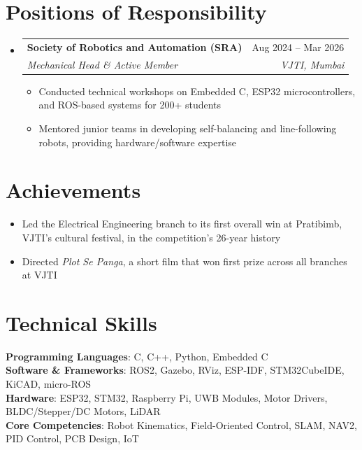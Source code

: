 \documentclass[a4paper,11pt]{article}
\makeatletter
\newcommand{\resumeItem}[1]{
  \item\small{
    {#1 \vspace{-2pt}}
  }
}
\newcommand{\resumeSubheading}[4]{
  \vspace{-2pt}\item
    \begin{tabular*}{0.97\textwidth}[t]{l@{\extracolsep{\fill}}r}
      \textbf{#1} & #2 \\
      \textit{\small#3} & \textit{\small #4} \\
    \end{tabular*}\vspace{-7pt}
}
\newcommand{\resumeItemListStart}{\begin{itemize}}
\newcommand{\resumeItemListEnd}{\end{itemize}\vspace{-7pt}}
\newcommand{\resumeSubHeadingListStart}{\begin{itemize}[leftmargin=0.15in, label={}]}
\newcommand{\resumeSubHeadingListEnd}{\end{itemize}}
\makeatother
\begin{document}
\section{Positions of Responsibility}
  \resumeSubHeadingListStart
    \resumeSubheading
      {Society of Robotics and Automation (SRA)}{Aug 2024 -- Mar 2026}
      {Mechanical Head \& Active Member}{VJTI, Mumbai}
      \resumeItemListStart
        \resumeItem{Conducted technical workshops on Embedded C, ESP32 microcontrollers, and ROS-based systems for 200+ students}
        \resumeItem{Mentored junior teams in developing self-balancing and line-following robots, providing hardware/software expertise}
      \resumeItemListEnd
  \resumeSubHeadingListEnd

\section{Achievements}
 \begin{itemize}[leftmargin=0.3in, label=\textendash]
    \resumeItem{Led the Electrical Engineering branch to its first overall win at Pratibimb, VJTI's cultural festival, in the competition's 26-year history}
    \resumeItem{Directed \emph{Plot Se Panga}, a short film that won first prize across all branches at VJTI}
 \end{itemize}\vspace{-7pt}

\section{Technical Skills}
 \begin{itemize}[leftmargin=0.15in, label={}]
    \small{\item{
     \textbf{Programming Languages}{: C, C++, Python, Embedded C} \\
     \textbf{Software \& Frameworks}{: ROS2, Gazebo, RViz, ESP-IDF, STM32CubeIDE, KiCAD, micro-ROS} \\
     \textbf{Hardware}{: ESP32, STM32, Raspberry Pi, UWB Modules, Motor Drivers, BLDC/Stepper/DC Motors, LiDAR} \\
     \textbf{Core Competencies}{: Robot Kinematics, Field-Oriented Control, SLAM, NAV2, PID Control, PCB Design, IoT}
    }}
 \end{itemize}
\end{document}
